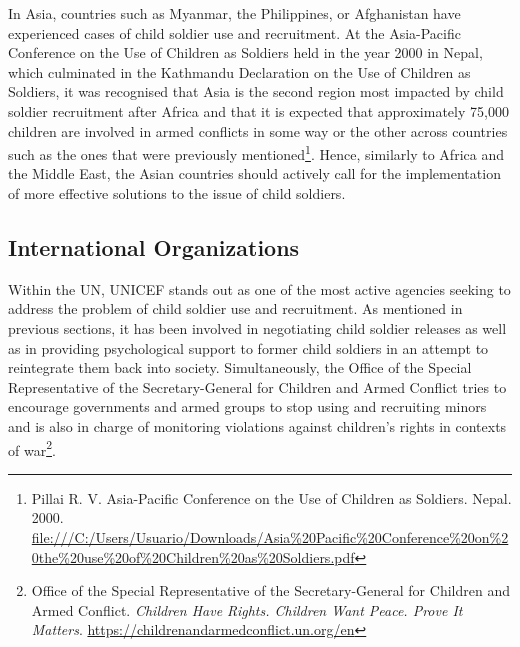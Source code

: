 In Asia, countries such as Myanmar, the Philippines, or Afghanistan have experienced cases of child soldier use and recruitment. At the Asia-Pacific Conference on the Use of Children as Soldiers held in the year 2000 in Nepal, which culminated in the Kathmandu Declaration on the Use of Children as Soldiers, it was recognised that Asia is the second region most impacted by child soldier recruitment after Africa and that it is expected that approximately 75,000 children are involved in armed conflicts in some way or the other across countries such as the ones that were previously mentioned\footnote{Pillai R. V. Asia-Pacific Conference on the Use of Children as Soldiers. Nepal. 2000. \url{file:///C:/Users/Usuario/Downloads/Asia\%20Pacific\%20Conference\%20on\%20the\%20use\%20of\%20Children\%20as\%20Soldiers.pdf}}. Hence, similarly to Africa and the Middle East, the Asian countries should actively call for the implementation of more effective solutions to the issue of child soldiers.

\subsection{International Organizations}

Within the UN, UNICEF stands out as one of the most active agencies seeking to address the problem of child soldier use and recruitment. As mentioned in previous sections, it has been involved in negotiating child soldier releases as well as in providing psychological support to former child soldiers in an attempt to reintegrate them back into society. Simultaneously, the Office of the Special Representative of the Secretary-General for Children and Armed Conflict tries to encourage governments and armed groups to stop using and recruiting minors and is also in charge of monitoring violations against children’s rights in contexts of war\footnote{Office of the Special Representative of the Secretary-General for Children and Armed Conflict. \emph{Children Have Rights. Children Want Peace. Prove It Matters}. \url{https://childrenandarmedconflict.un.org/en}}.

